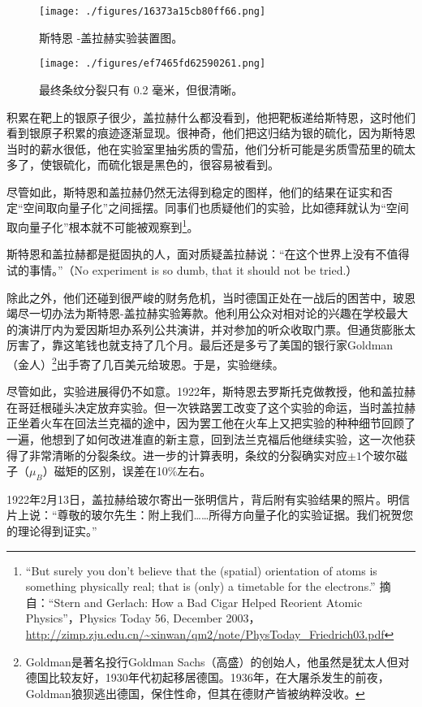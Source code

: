 \begin{figure}[ht]
\centering
\texttt{[image: ./figures/16373a15cb80ff66.png]}
\caption{斯特恩 -盖拉赫实验装置图。} \label{fig_QMPre2_21}
\end{figure}
\begin{figure}[ht]
\centering
\texttt{[image: ./figures/ef7465fd62590261.png]}
\caption{最终条纹分裂只有 0.2 毫米，但很清晰。} \label{fig_QMPre2_22}
\end{figure}


积累在靶上的银原子很少，盖拉赫什么都没看到，他把靶板递给斯特恩，这时他们看到银原子积累的痕迹逐渐显现。很神奇，他们把这归结为银的硫化，因为斯特恩当时的薪水很低，他在实验室里抽劣质的雪茄，他们分析可能是劣质雪茄里的硫太多了，使银硫化，而硫化银是黑色的，很容易被看到。

尽管如此，斯特恩和盖拉赫仍然无法得到稳定的图样，他们的结果在证实和否定“空间取向量子化”之间摇摆。同事们也质疑他们的实验，比如德拜就认为“空间取向量子化”根本就不可能被观察到\footnote{“But surely you don’t believe that the (spatial) orientation of atoms is something physically real; that is (only) a timetable for the electrons.”  摘自：“Stern and Gerlach: How a Bad Cigar Helped Reorient Atomic Physics”，Physics Today 56, December 2003， \url{http://zimp.zju.edu.cn/~xinwan/qm2/note/PhysToday_Friedrich03.pdf} }。

斯特恩和盖拉赫都是挺固执的人，面对质疑盖拉赫说：“在这个世界上没有不值得试的事情。”（No experiment is so dumb, that it should not be tried.）

除此之外，他们还碰到很严峻的财务危机，当时德国正处在一战后的困苦中，玻恩竭尽一切办法为斯特恩-盖拉赫实验筹款。他利用公众对相对论的兴趣在学校最大的演讲厅内为爱因斯坦办系列公共演讲，并对参加的听众收取门票。但通货膨胀太厉害了，靠这笔钱也就支持了几个月。最后还是多亏了美国的银行家Goldman（金人）\footnote{Goldman是著名投行Goldman Sachs（高盛）的创始人，他虽然是犹太人但对德国比较友好，1930年代初起移居德国。1936年，在大屠杀发生的前夜，Goldman狼狈逃出德国，保住性命，但其在德财产皆被纳粹没收。}出手寄了几百美元给玻恩。于是，实验继续。

尽管如此，实验进展得仍不如意。1922年，斯特恩去罗斯托克做教授，他和盖拉赫在哥廷根碰头决定放弃实验。但一次铁路罢工改变了这个实验的命运，当时盖拉赫正坐着火车在回法兰克福的途中，因为罢工他在火车上又把实验的种种细节回顾了一遍，他想到了如何改进准直的新主意，回到法兰克福后他继续实验，这一次他获得了非常清晰的分裂条纹。进一步的计算表明，条纹的分裂确实对应$\pm 1$个玻尔磁子（$\mu_B $）磁矩的区别，误差在10\%左右。

1922年2月13日，盖拉赫给玻尔寄出一张明信片，背后附有实验结果的照片。明信片上说：“尊敬的玻尔先生：附上我们……所得方向量子化的实验证据。我们祝贺您的理论得到证实。”

